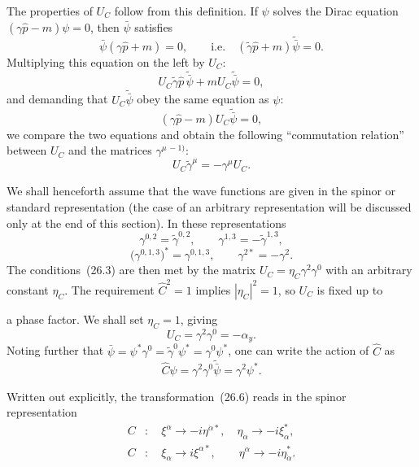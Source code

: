 The properties of $U_C$ follow from this definition. If $\psi$ solves the Dirac equation $(\gamma\widehat p - m)\psi = 0$, then $\bar\psi$ satisfies
\[
\bar\psi(\gamma\widehat p + m) = 0,\qquad \text{i.e.}\quad (\widetilde\gamma\widehat p + m)\widetilde{\bar\psi} = 0.
\]
Multiplying this equation on the left by $U_C$:
\[
U_C\widetilde\gamma\widehat p\,\widetilde{\bar\psi} + mU_C\widetilde{\bar\psi} = 0,
\]
and demanding that $U_C\widetilde{\bar\psi}$ obey the same equation as $\psi$:
\[
(\gamma\widehat p - m)U_C\widetilde{\bar\psi} = 0,
\]
we compare the two equations and obtain the following ``commutation relation'' between $U_C$ and the matrices $\gamma^{\mu\,-1)}$:
\begin{equation}
U_C\widetilde\gamma^\mu = -\gamma^\mu U_C.
\tag{26.3}
\end{equation}

We shall henceforth assume that the wave functions are given in the spinor or standard representation (the case of an arbitrary representation will be discussed only at the end of this section). In these representations
\[
\gamma^{0,2} = \widetilde\gamma^{0,2},\qquad \gamma^{1,3} = -\widetilde\gamma^{1,3},
\]
\begin{equation}
\bigl(\gamma^{0,1,3}\bigr)^* = \gamma^{0,1,3},\qquad \gamma^{2*} = -\gamma^2.
\tag{26.4}
\end{equation}
The conditions~(26.3) are then met by the matrix $U_C = \eta_C\gamma^2\gamma^0$ with an arbitrary constant $\eta_C$. The requirement $\widehat C^2 = 1$ implies $|\eta_C|^2 = 1$, so $U_C$ is fixed up to

a phase factor. We shall set $\eta_C = 1$, giving
\begin{equation}
U_C = \gamma^2\gamma^0 = -\alpha_y.
\tag{26.5}
\end{equation}
Noting further that $\bar\psi = \psi^*\gamma^0 = \widetilde\gamma^0\psi^* = \gamma^0\psi^*$, one can write the action of $\widehat C$ as
\begin{equation}
\widehat C\psi = \gamma^2\gamma^0\widetilde{\bar\psi} = \gamma^2\psi^*.
\tag{26.6}
\end{equation}

Written out explicitly, the transformation~(26.6) reads in the spinor representation
\begin{equation}
\begin{aligned}
C&:\quad \xi^\alpha \to -i\eta^{\dot\alpha*},\quad \eta_{\dot\alpha} \to -i\xi^*_\alpha,\\
C&:\quad \xi_\alpha \to i\xi^{\alpha*},\qquad \eta^\alpha \to -i\eta^*_{\dot\alpha}.
\end{aligned}
\tag{26.7a,\,b}
\end{equation}

